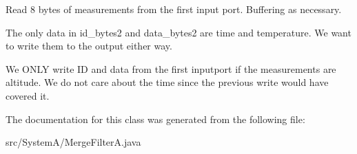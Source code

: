 Read 8 bytes of measurements from the first input port. Buffering as necessary.

The only data in id\+\_\+bytes2 and data\+\_\+bytes2 are time and temperature. We want to write them to the output either way.

We O\+N\+L\+Y write I\+D and data from the first inputport if the measurements are altitude. We do not care about the time since the previous write would have covered it.

The documentation for this class was generated from the following file\+:\begin{DoxyCompactItemize}
\item 
src/\+System\+A/Merge\+Filter\+A.\+java\end{DoxyCompactItemize}
